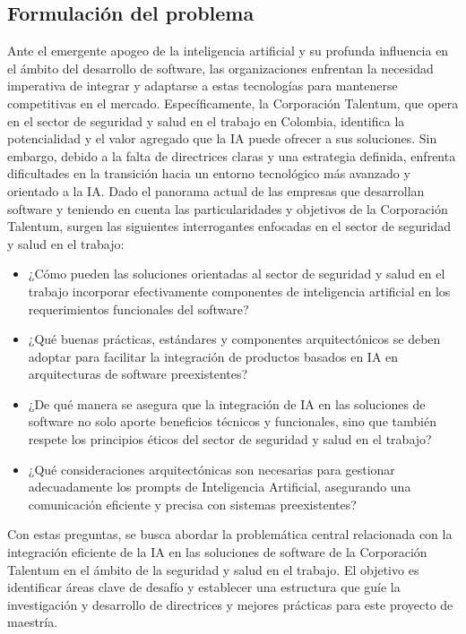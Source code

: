 \subsection{Formulación del problema}

Ante el emergente apogeo de la inteligencia artificial y su profunda influencia en el ámbito del desarrollo de software, las organizaciones enfrentan la necesidad imperativa de integrar y adaptarse a estas tecnologías para mantenerse competitivas en el mercado. Específicamente, la Corporación Talentum, que opera en el sector de seguridad y salud en el trabajo en Colombia, identifica la potencialidad y el valor agregado que la IA puede ofrecer a sus soluciones. Sin embargo, debido a la falta de directrices claras y una estrategia definida, enfrenta dificultades en la transición hacia un entorno tecnológico más avanzado y orientado a la IA.
Dado el panorama actual de las empresas que desarrollan software y teniendo en cuenta las particularidades y objetivos de la Corporación Talentum, surgen las siguientes interrogantes enfocadas en el sector de seguridad y salud en el trabajo:
\begin{itemize}
    \item ¿Cómo pueden las soluciones orientadas al sector de seguridad y salud en el trabajo incorporar efectivamente componentes de inteligencia artificial en los requerimientos funcionales del software?
    \item ¿Qué buenas prácticas, estándares y componentes arquitectónicos se deben adoptar para facilitar la integración de productos basados en IA en arquitecturas de software preexistentes?
    \item ¿De qué manera se asegura que la integración de IA en las soluciones de software no solo aporte beneficios técnicos y funcionales, sino que también respete los principios éticos del sector de seguridad y salud en el trabajo?
    \item ¿Qué consideraciones arquitectónicas son necesarias para gestionar adecuadamente los prompts de Inteligencia Artificial, asegurando una comunicación eficiente y precisa con sistemas preexistentes?
\end{itemize}

Con estas preguntas, se busca abordar la problemática central relacionada con la integración eficiente de la IA en las soluciones de software de la Corporación Talentum en el ámbito de la seguridad y salud en el trabajo. El objetivo es identificar áreas clave de desafío y establecer una estructura que guíe la investigación y desarrollo de directrices y mejores prácticas para este proyecto de maestría. 
